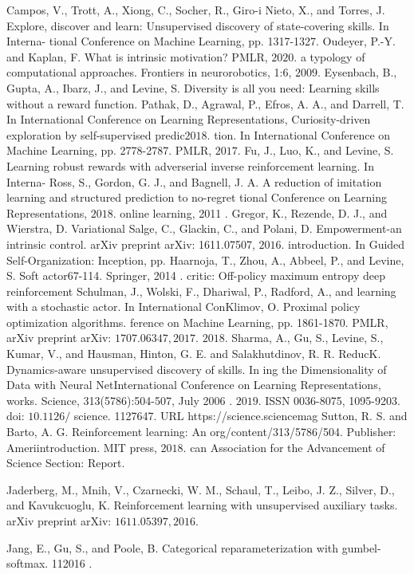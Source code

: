 Campos, V., Trott, A., Xiong, C., Socher, R., Giro-i Nieto, X., and Torres, J. Explore, discover and learn: Unsupervised discovery of state-covering skills. In Interna- tional Conference on Machine Learning, pp. 1317-1327. Oudeyer, P.-Y. and Kaplan, F. What is intrinsic motivation? PMLR, $2020 .$ a typology of computational approaches. Frontiers in neurorobotics, 1:6, $2009 .$ Eysenbach, B., Gupta, A., Ibarz, J., and Levine, S. Diversity is all you need: Learning skills without a reward function. Pathak, D., Agrawal, P., Efros, A. A., and Darrell, T. In International Conference on Learning Representations, Curiosity-driven exploration by self-supervised predic$2018 .$ tion. In International Conference on Machine Learning, pp. 2778-2787. PMLR, $2017 .$ Fu, J., Luo, K., and Levine, S. Learning robust rewards with adverserial inverse reinforcement learning. In Interna- Ross, S., Gordon, G. J., and Bagnell, J. A. A reduction of imitation learning and structured prediction to no-regret tional Conference on Learning Representations, $2018 .$ online learning, 2011 . Gregor, K., Rezende, D. J., and Wierstra, D. Variational Salge, C., Glackin, C., and Polani, D. Empowerment-an intrinsic control. arXiv preprint arXiv: 1611.07507, $2016 .$ introduction. In Guided Self-Organization: Inception, pp. Haarnoja, T., Zhou, A., Abbeel, P., and Levine, S. Soft actor67-114. Springer, 2014 . critic: Off-policy maximum entropy deep reinforcement Schulman, J., Wolski, F., Dhariwal, P., Radford, A., and learning with a stochastic actor. In International ConKlimov, O. Proximal policy optimization algorithms. ference on Machine Learning, pp. 1861-1870. PMLR, arXiv preprint arXiv: $1707.06347,2017 .$ $2018 .$ Sharma, A., Gu, S., Levine, S., Kumar, V., and Hausman, Hinton, G. E. and Salakhutdinov, R. R. ReducK. Dynamics-aware unsupervised discovery of skills. In ing the Dimensionality of Data with Neural NetInternational Conference on Learning Representations, works. Science, 313(5786):504-507, July 2006 . $2019 .$ ISSN 0036-8075, 1095-9203. doi: $10.1126 /$ science. 1127647. URL https://science.sciencemag Sutton, R. S. and Barto, A. G. Reinforcement learning: An org/content/313/5786/504. Publisher: Ameriintroduction. MIT press, $2018 .$ can Association for the Advancement of Science Section: Report.

Jaderberg, M., Mnih, V., Czarnecki, W. M., Schaul, T., Leibo, J. Z., Silver, D., and Kavukcuoglu, K. Reinforcement learning with unsupervised auxiliary tasks. arXiv preprint arXiv: $1611.05397,2016 .$

Jang, E., Gu, S., and Poole, B. Categorical reparameterization with gumbel-softmax. 112016 .

